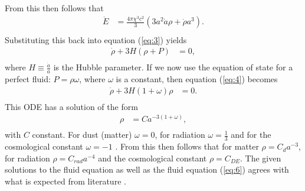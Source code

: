 \documentclass[a4paper, 11pt]{FSKH_623_Report}
\numberwithin{equation}{section}
\begin{document}
From this then follows that
\begin{equation}\label{eq:Stuff2}
\begin{split}
\dot{E} &= \frac{4\pi\chi^{3} c^{2}}{3}\left(3a^{2}\dot{a}\rho+\dot{\rho}a^{3}\right).\\
\end{split}
\end{equation}
Substituting this back into equation (\ref{eq:3}) yields
\begin{equation}\label{eq:4}
\begin{split}
\dot{\rho}+3H\left(\rho+P\right) &= 0,\\
\end{split}
\end{equation}
where $H\equiv\frac{\dot{a}}{a}$ is the Hubble parameter.
If we now use the equation of state for a perfect fluid: $P=\rho\omega$, where $\omega$ is a constant, then equation (\ref{eq:4}) becomes
\begin{equation}\label{eq:6}
\begin{split}
\dot{\rho}+3H\left(1+\omega\right)\rho &= 0.\\
\end{split}
\end{equation}
This ODE has a solution of the form  
\begin{equation}
\begin{split}
\rho &= Ca^{-3\left(1+\omega\right)},\\
\end{split}
\end{equation}
with $C$ constant.
For dust (matter) $\omega=0$, for radiation $\omega=\frac{1}{3}$ and for the cosmological constant $\omega=-1$ \citep{notes4, GRFD}. From this then follows that for matter $\rho = C_{d}a^{-3}$, for radiation $\rho = C_{rad}a^{-4}$ and the cosmological constant $\rho = C_{DE}$. 
The given solutions to the fluid equation as well as the fluid equation (\ref{eq:6}) agrees with what is expected from literature \citep{GRFD, ITC}. 
\end{document}
